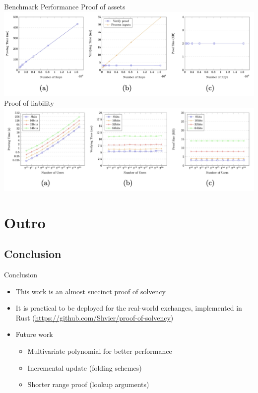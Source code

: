 \documentclass{beamer}
\begin{document}
  \begin{frame}{Benchmark Performance}
    Proof of assets
    \includegraphics[scale=0.13]{poa.png}\\
    Proof of liability
    \includegraphics[scale=0.13]{pol.png}
  \end{frame}


  \section{Outro}

  \subsection{Conclusion}

  \begin{frame}{Conclusion}
    \begin{itemize}
      \item This work is an almost succinct proof of solvency
      \item It is practical to be deployed for the real-world exchanges, implemented in Rust (\href{https://github.com/Shvier/proof-of-solvency}{https://github.com/Shvier/proof-of-solvency})
      \item Future work
      \begin{itemize}
          \item Multivariate polynomial for better performance
          \item Incremental update (folding schemes)
          \item Shorter range proof (lookup arguments) 
      \end{itemize}
    \end{itemize}
  \end{frame}
\end{document}

